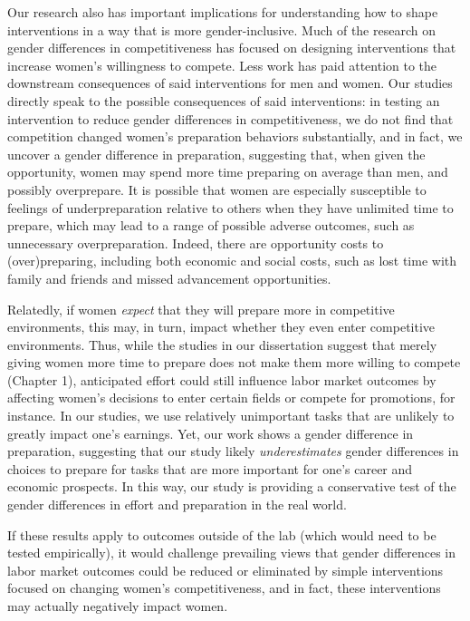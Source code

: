 \documentclass[a4paper, nobind]{templates/ociamthesis}
\begin{document}
Our research also has important implications for understanding how to shape interventions in a way that is more gender-inclusive. Much of the research on gender differences in competitiveness has focused on designing interventions that increase women's willingness to compete. Less work has paid attention to the downstream consequences of said interventions for men and women. Our studies directly speak to the possible consequences of said interventions: in testing an intervention to reduce gender differences in competitiveness, we do not find that competition changed women's preparation behaviors substantially, and in fact, we uncover a gender difference in preparation, suggesting that, when given the opportunity, women may spend more time preparing on average than men, and possibly overprepare.
It is possible that women are especially susceptible to feelings of underpreparation relative to others when they have unlimited time to prepare, which may lead to a range of possible adverse outcomes, such as unnecessary overpreparation. Indeed, there are opportunity costs to (over)preparing, including both economic and social costs, such as lost time with family and friends and missed advancement opportunities.

Relatedly, if women \emph{expect} that they will prepare more in competitive environments, this may, in turn, impact whether they even enter competitive environments. Thus, while the studies in our dissertation suggest that merely giving women more time to prepare does not make them more willing to compete (Chapter 1), anticipated effort could still influence labor market outcomes by affecting women's decisions to enter certain fields or compete for promotions, for instance. In our studies, we use relatively unimportant tasks that are unlikely to greatly impact one's earnings. Yet, our work shows a gender difference in preparation, suggesting that our study likely \emph{underestimates} gender differences in choices to prepare for tasks that are more important for one's career and economic prospects. In this way, our study is providing a conservative test of the gender differences in effort and preparation in the real world.

If these results apply to outcomes outside of the lab (which would need to be tested empirically), it would challenge prevailing views that gender differences in labor market outcomes could be reduced or eliminated by simple interventions focused on changing women's competitiveness, and in fact, these interventions may actually negatively impact women.
\end{document}
